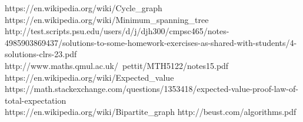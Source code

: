 \documentclass[12pt]{article}
\begin{document}
\newpage
\begin{thebibliography}{10}
	 https://en.wikipedia.org/wiki/Cycle\_graph\\
	 https://en.wikipedia.org/wiki/Minimum\_spanning\_tree\\
	 http://test.scripts.psu.edu/users/d/j/djh300/cmpsc465/notes-4985903869437/solutions-to-some-homework-exercises-as-shared-with-students/4-solutions-clrs-23.pdf\\
	 http://www.maths.qmul.ac.uk/~pettit/MTH5122/notes15.pdf\\
	 https://en.wikipedia.org/wiki/Expected\_value\\
	 https://math.stackexchange.com/questions/1353418/expected-value-proof-law-of-total-expectation\\
	 https://en.wikipedia.org/wiki/Bipartite\_graph
	 http://beust.com/algorithms.pdf
\end{thebibliography}
\end{document}
